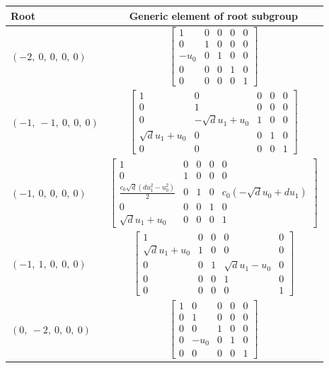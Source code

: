 \documentclass[11pt]{article}
\theoremstyle{definition}
\begin{document}
\noindent \begin{longtable}{|l|c|}
    \hline
    \textbf{Root} & \textbf{Generic element of root subgroup} \\
    \hline
    \endhead
    $\left( -2, \  0, \  0, \  0, \  0\right)$ & ${\left[\begin{matrix}1 & 0 & 0 & 0 & 0\\0 & 1 & 0 & 0 & 0\\- u_{0} & 0 & 1 & 0 & 0\\0 & 0 & 0 & 1 & 0\\0 & 0 & 0 & 0 & 1\end{matrix}\right]}$ \\
    \hline
    $\left( -1, \  -1, \  0, \  0, \  0\right)$ & ${\left[\begin{matrix}1 & 0 & 0 & 0 & 0\\0 & 1 & 0 & 0 & 0\\0 & - \sqrt{d} u_{1} + u_{0} & 1 & 0 & 0\\\sqrt{d} u_{1} + u_{0} & 0 & 0 & 1 & 0\\0 & 0 & 0 & 0 & 1\end{matrix}\right]}$ \\
    \hline
    $\left( -1, \  0, \  0, \  0, \  0\right)$ & ${\left[\begin{matrix}1 & 0 & 0 & 0 & 0\\0 & 1 & 0 & 0 & 0\\\frac{c_{0} \sqrt{d} \left(d u_{1}^{2} - u_{0}^{2}\right)}{2} & 0 & 1 & 0 & c_{0} \left(- \sqrt{d} u_{0} + d u_{1}\right)\\0 & 0 & 0 & 1 & 0\\\sqrt{d} u_{1} + u_{0} & 0 & 0 & 0 & 1\end{matrix}\right]}$ \\
    \hline
    $\left( -1, \  1, \  0, \  0, \  0\right)$ & ${\left[\begin{matrix}1 & 0 & 0 & 0 & 0\\\sqrt{d} u_{1} + u_{0} & 1 & 0 & 0 & 0\\0 & 0 & 1 & \sqrt{d} u_{1} - u_{0} & 0\\0 & 0 & 0 & 1 & 0\\0 & 0 & 0 & 0 & 1\end{matrix}\right]}$ \\
    \hline
    $\left( 0, \  -2, \  0, \  0, \  0\right)$ & ${\left[\begin{matrix}1 & 0 & 0 & 0 & 0\\0 & 1 & 0 & 0 & 0\\0 & 0 & 1 & 0 & 0\\0 & - u_{0} & 0 & 1 & 0\\0 & 0 & 0 & 0 & 1\end{matrix}\right]}$ \\

\end{longtable}
\end{document}
